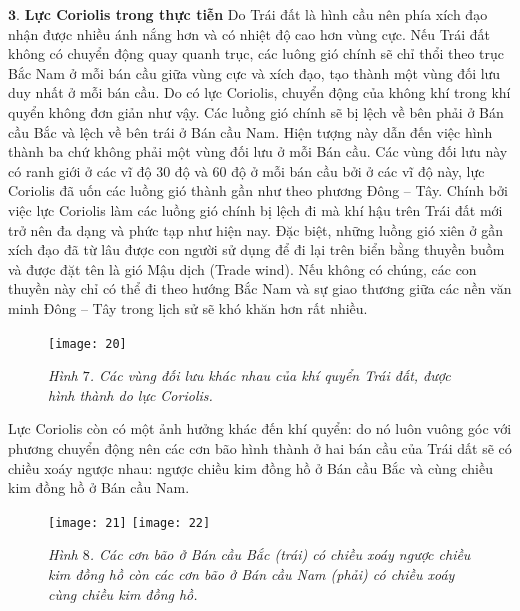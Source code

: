 \begin{multicols}{2}
\begin{figure}[H]
		\vspace*{-10pt}
	\end{figure}
	$\pmb{3.}$ \textbf{Lực Coriolis trong thực tiễn}
	\vskip 0.1cm
	Do Trái đất là hình cầu nên phía xích đạo nhận được nhiều ánh nắng hơn và có nhiệt độ cao hơn vùng cực. Nếu Trái đất không có chuyển động quay quanh trục, các luông gió chính sẽ chỉ thổi theo trục Bắc Nam ở mỗi bán cầu giữa vùng cực và xích đạo, tạo thành một vùng đối lưu duy nhất ở mỗi bán cầu.
	\vskip 0.1cm
	Do có lực Coriolis, chuyển động của không khí trong khí quyển không đơn giản như vậy. Các luồng gió chính sẽ bị lệch về bên phải ở Bán cầu Bắc và lệch về bên trái ở Bán cầu Nam. Hiện tượng này dẫn đến việc hình \linebreak thành ba chứ không phải một vùng đối lưu ở mỗi Bán cầu. Các vùng đối lưu này có ranh giới ở các vĩ độ $30$ độ và $60$ độ ở mỗi bán cầu bởi ở các vĩ độ này, lực Coriolis đã uốn các luồng gió thành gần như theo phương Đông -- Tây.
	\vskip 0.1cm 
	Chính bởi việc lực Coriolis làm các luồng gió chính bị lệch đi mà khí hậu trên Trái đất mới trở nên đa dạng và phức tạp như hiện nay. Đặc biệt, những luồng gió xiên ở gần xích đạo đã từ lâu được con người sử dụng để đi lại trên biển bằng thuyền buồm và được đặt tên là gió Mậu dịch (Trade wind). Nếu không có chúng, các con thuyền này chỉ có thể đi theo hướng Bắc Nam và sự giao thương giữa các nền văn minh Đông -- Tây trong lịch sử sẽ khó khăn hơn rất nhiều.
	\begin{figure}[H]
		\vspace*{-5pt}
		\centering
		\captionsetup{labelformat= empty, justification=centering}
		\texttt{[image: 20]}
		\caption{\small\textit{\color{timhieukhoahoc}Hình $7$. Các vùng đối lưu khác nhau của khí quyển Trái đất, được hình thành do lực Coriolis.}}
		\vspace*{-10pt}
	\end{figure}
	Lực Coriolis còn có một ảnh hưởng khác đến khí quyển: do nó luôn vuông góc với phương chuyển động nên các cơn bão hình thành ở hai bán cầu của Trái dất sẽ có chiều xoáy ngược nhau: ngược chiều kim đồng hồ ở Bán cầu Bắc và cùng chiều kim đồng hồ ở Bán cầu Nam. 
	\begin{figure}[H]
		\vspace*{-5pt}
		\centering
		\captionsetup{labelformat= empty, justification=centering}
		\texttt{[image: 21]}
		\texttt{[image: 22]}
		\caption{\small\textit{\color{timhieukhoahoc}Hình $8$. Các cơn bão ở Bán cầu Bắc (trái) có chiều xoáy ngược chiều kim đồng hồ còn các cơn bão ở Bán cầu Nam (phải) có chiều xoáy cùng chiều kim đồng hồ.}}

\end{figure}
\end{multicols}
